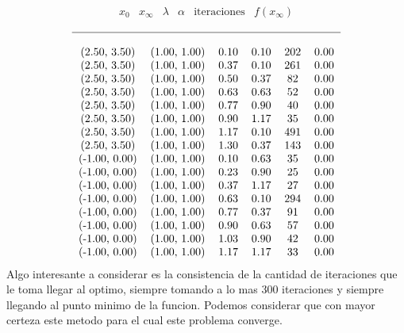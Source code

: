 \documentclass[letterpaper]{article}
\begin{document}
\[ \begin{matrix}
    x_{0} & x_{\infty} & \lambda & \alpha & \text{iteraciones} & f(x_{\infty}) \\
  \end{matrix}
\]
\[
\begin{tabular}{c c c c c c}
  \hline \\
(2.50, 3.50)  & (1.00, 1.00) & 0.10 & 0.10 & 202 & 0.00 \\
(2.50, 3.50)  & (1.00, 1.00) & 0.37 & 0.10 & 261 & 0.00 \\
(2.50, 3.50)  & (1.00, 1.00) & 0.50 & 0.37 & 82  & 0.00 \\
(2.50, 3.50)  & (1.00, 1.00) & 0.63 & 0.63 & 52  & 0.00 \\
(2.50, 3.50)  & (1.00, 1.00) & 0.77 & 0.90 & 40  & 0.00 \\
(2.50, 3.50)  & (1.00, 1.00) & 0.90 & 1.17 & 35  & 0.00 \\
(2.50, 3.50)  & (1.00, 1.00) & 1.17 & 0.10 & 491 & 0.00 \\
(2.50, 3.50)  & (1.00, 1.00) & 1.30 & 0.37 & 143 & 0.00 \\
(-1.00, 0.00) & (1.00, 1.00) & 0.10 & 0.63 & 35  & 0.00 \\
(-1.00, 0.00) & (1.00, 1.00) & 0.23 & 0.90 & 25  & 0.00 \\
(-1.00, 0.00) & (1.00, 1.00) & 0.37 & 1.17 & 27  & 0.00 \\
(-1.00, 0.00) & (1.00, 1.00) & 0.63 & 0.10 & 294 & 0.00 \\
(-1.00, 0.00) & (1.00, 1.00) & 0.77 & 0.37 & 91  & 0.00 \\
(-1.00, 0.00) & (1.00, 1.00) & 0.90 & 0.63 & 57  & 0.00 \\
(-1.00, 0.00) & (1.00, 1.00) & 1.03 & 0.90 & 42  & 0.00 \\
(-1.00, 0.00) & (1.00, 1.00) & 1.17 & 1.17 & 33  & 0.00 \\
\end{tabular}
\]
Algo interesante a considerar es la consistencia de la cantidad de
iteraciones que le toma llegar al optimo, siempre tomando a lo mas 300
iteraciones y siempre llegando al punto minimo de la funcion. Podemos
considerar que con mayor certeza este metodo para el cual este problema
converge.
\end{document}

